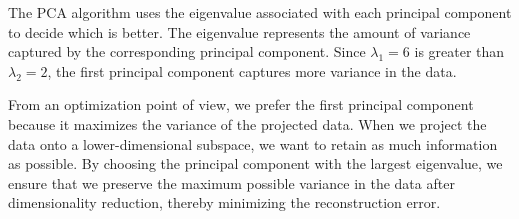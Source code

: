 The PCA algorithm uses the eigenvalue associated with each principal component to decide which is better. The eigenvalue represents the amount of variance captured by the corresponding principal component. Since $\lambda_1 = 6$ is greater than $\lambda_2 = 2$, the first principal component captures more variance in the data.

From an optimization point of view, we prefer the first principal component because it maximizes the variance of the projected data. When we project the data onto a lower-dimensional subspace, we want to retain as much information as possible. By choosing the principal component with the largest eigenvalue, we ensure that we preserve the maximum possible variance in the data after dimensionality reduction, thereby minimizing the reconstruction error.










\newpage